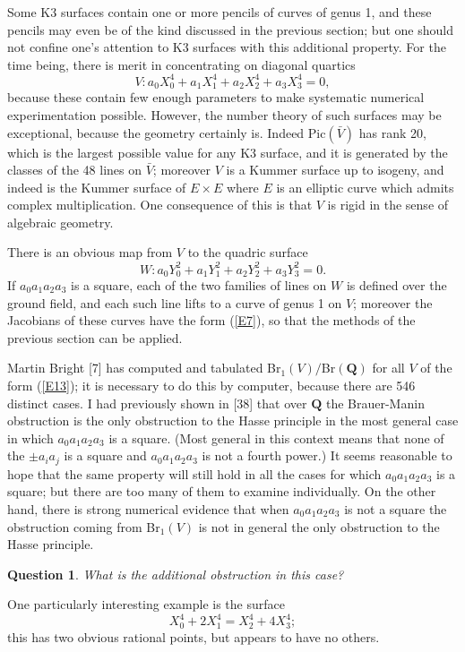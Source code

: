 \documentclass[12pt]{article}
\def\bQ{{\mathbf Q}}
\def\beq{\begin{equation} \label}
\def\bpr{\begin{question} \label}
\def\epr{\end{question}}
\newtheorem{question}{Question}
\begin{document}
Some K3 surfaces contain one or more pencils of curves of genus 1, and these
pencils may even be of the kind discussed in the previous section;
but one should not
confine one's attention to K3 surfaces with this additional property. For
the time being, there is
merit in concentrating on diagonal quartics
\beq{E13} V:a_0X_0^4+a_1X_1^4+a_2X_2^4+a_3X_3^4=0, \end{equation}
because these contain few enough parameters to make systematic numerical
experimentation possible. However, the number theory of such surfaces may be
exceptional, because the geometry certainly is. Indeed
Pic$(\bar{V})$ has rank 20, which is the largest possible value for any
K3 surface, and it is generated by the classes of the 48 lines on $\bar{V}$;
moreover $V$ is a Kummer surface up to isogeny, and indeed is the Kummer
surface of $E\times E$ where $E$ is an elliptic curve which admits complex
multiplication. One consequence of this is that $V$ is rigid in the sense of
algebraic geometry.

There is an obvious map from $V$ to the quadric surface
\[ W:a_0Y_0^2+a_1Y_1^2+a_2Y_2^2+a_3Y_3^2=0. \]
If $a_0a_1a_2a_3$ is a square, each of the two families of lines on $W$ is
defined over the ground field, and each such line lifts to a curve of genus 1
on $V$; moreover the Jacobians of these curves have the form (\ref{E7}), so
that the methods of the previous section can be applied.

Martin Bright [7] has computed and tabulated Br$_1(V)/$Br$(\bQ)$ for all
$V$ of the form (\ref{E13}); it is necessary to do this by computer, because
there are 546 distinct cases. I had previously shown in [38] that
over $\bQ$ the Brauer-Manin obstruction is the only obstruction to the Hasse
principle in the most general case in which $a_0a_1a_2a_3$ is a square. (Most
general in this context means that none of the $\pm a_ia_j$ is a square and
$a_0a_1a_2a_3$ is not a fourth power.) It seems reasonable to hope that the
same property will still hold in all the cases for which $a_0a_1a_2a_3$ is a
square; but there are too many of them
to examine individually. On the other hand, there is strong numerical
evidence that when $a_0a_1a_2a_3$ is not a square the obstruction coming
from Br$_1(V)$
is not in general the only obstruction to the Hasse principle.
\bpr{Q14} What is the additional obstruction in this case?
\epr
One particularly interesting example is the surface
\beq{E9} X_0^4+2X_1^4=X_2^4+4X_3^4; \end{equation}
this has two obvious rational points, but appears to have no others.
\end{document}
